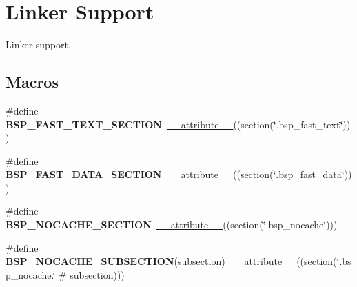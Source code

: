 \hypertarget{group__RTEMSBSPsPowerPCSharedLinker}{}\section{Linker Support}
\label{group__RTEMSBSPsPowerPCSharedLinker}


Linker support.  


\subsection*{Macros}
\begin{DoxyCompactItemize}
\item 
\mbox{\label{group__RTEMSBSPsPowerPCSharedLinker_gabe1e835c1eec56e262fa720a87dad647}} 
\#define {\bfseries B\+S\+P\+\_\+\+F\+A\+S\+T\+\_\+\+T\+E\+X\+T\+\_\+\+S\+E\+C\+T\+I\+ON}~\mbox{\hyperlink{struct____attribute____}{\+\_\+\+\_\+attribute\+\_\+\+\_\+}}((section(\char`\"{}.bsp\+\_\+fast\+\_\+text\char`\"{})))
\item 
\mbox{\label{group__RTEMSBSPsPowerPCSharedLinker_ga92c8020c243774f015eb1c0358aba4da}} 
\#define {\bfseries B\+S\+P\+\_\+\+F\+A\+S\+T\+\_\+\+D\+A\+T\+A\+\_\+\+S\+E\+C\+T\+I\+ON}~\mbox{\hyperlink{struct____attribute____}{\+\_\+\+\_\+attribute\+\_\+\+\_\+}}((section(\char`\"{}.bsp\+\_\+fast\+\_\+data\char`\"{})))
\item 
\mbox{\label{group__RTEMSBSPsPowerPCSharedLinker_ga3ad09e2d6988d8d57b1b9eab52142ca0}} 
\#define {\bfseries B\+S\+P\+\_\+\+N\+O\+C\+A\+C\+H\+E\+\_\+\+S\+E\+C\+T\+I\+ON}~\mbox{\hyperlink{struct____attribute____}{\+\_\+\+\_\+attribute\+\_\+\+\_\+}}((section(\char`\"{}.bsp\+\_\+nocache\char`\"{})))
\item 
\mbox{\label{group__RTEMSBSPsPowerPCSharedLinker_ga5680db208604be018d602d9824cdd557}} 
\#define {\bfseries B\+S\+P\+\_\+\+N\+O\+C\+A\+C\+H\+E\+\_\+\+S\+U\+B\+S\+E\+C\+T\+I\+ON}(subsection)~\mbox{\hyperlink{struct____attribute____}{\+\_\+\+\_\+attribute\+\_\+\+\_\+}}((section(\char`\"{}.bsp\+\_\+nocache.\char`\"{} \# subsection)))
\item 
\mbox{\label{group__RTEMSBSPsPowerPCSharedLinker_ga672d57deb2514abc3c35a443e4a06956}} 

\end{DoxyCompactItemize}
